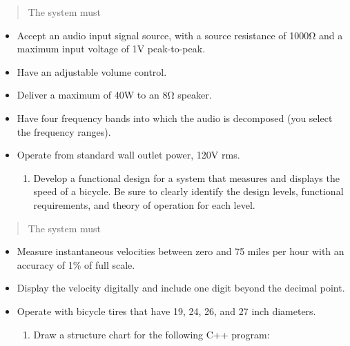\begin{quote}
The system must
\end{quote}

\begin{itemize}
\item
  Accept an audio input signal source, with a source resistance of 1000Ω
  and a maximum input voltage of 1V peak-to-peak.
\item
  Have an adjustable volume control.
\item
  Deliver a maximum of 40W to an 8Ω speaker.
\end{itemize}

\begin{itemize}
\item
  Have four frequency bands into which the audio is decomposed (you
  select the frequency ranges).
\item
  Operate from standard wall outlet power, 120V rms.

  \begin{enumerate}
  \def\labelenumi{\arabic{enumi}.}
  \item
    Develop a functional design for a system that measures and displays
    the speed of a bicycle. Be sure to clearly identify the design
    levels, functional requirements, and theory of operation for each
    level.
  \end{enumerate}
\end{itemize}

\begin{quote}
The system must
\end{quote}

\begin{itemize}
\item
  Measure instantaneous velocities between zero and 75 miles per hour
  with an accuracy of 1\% of full scale.
\item
  Display the velocity digitally and include one digit beyond the
  decimal point.
\item
  Operate with bicycle tires that have 19, 24, 26, and 27 inch
  diameters.

  \begin{enumerate}
  \def\labelenumi{\arabic{enumi}.}
  \item
    Draw a structure chart for the following C++ program:
  \end{enumerate}
\end{itemize}

